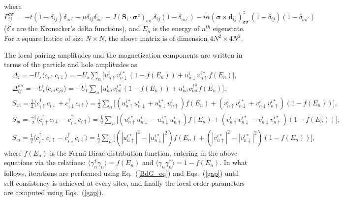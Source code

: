 \documentclass[aps,prl,reprint,nobibnotes]{revtex4-1}
\begin{document}
\noindent where $\Gamma_{ij}^{\sigma\sigma^{\prime}}=-t(1-\delta_{ij})\delta_{\sigma \sigma^{\prime}}-\mu \delta_{ij} \delta_{\sigma \sigma^{\prime}}-J(\mathbf{S}_i \cdot \boldsymbol{\sigma}^{z})_{\sigma\sigma^{\prime}}\delta_{ij}(1-\delta_{\sigma\sigma^{\prime}}) -i\alpha ({\boldsymbol{\sigma}}{\times}\mathbf{d}_{ij})_{\sigma \sigma^{'}}^{z}(1-\delta_{ij})(1- \delta_{\sigma \sigma^{\prime}})$ ($\delta$'s are the Kronecker's delta functions), and $E_n$ is the energy of $n^{th}$ eigenstate. For a square lattice of size $N \times N$, the above matrix is of dimension $4N^2 \times 4N^2$.

The local pairing amplitudes and the magnetization components are written in terms of the particle and hole amplitudes as 
\begin{align}
&\Delta_i=-U_s\langle c_{i\uparrow}c_{i\downarrow}\rangle=-U_s\sum_{n}  \Big[ u_{n\uparrow}^i v_{n\downarrow}^{i*}(1-f(E_n))+u_{n\downarrow}^i v_{n\uparrow}^{i*}f(E_n) \Big], \nonumber \\
&\Delta_{ij}^{\sigma \sigma}=-U_t \langle c_{i\sigma}c_{j\sigma}\rangle=-U_t\sum_{n} \Big[ u_{n\sigma}^i v_{n\sigma}^{j*}(1-f(E_n))+u_{n\sigma}^i v_{n\sigma}^{j*}f(E_n) \Big], \nonumber \\
&S_{xi}=\frac{1}{2}\langle c_{i\uparrow}^{\dagger}c_{i\downarrow}+c_{i\downarrow}^{\dagger}c_{i\uparrow} \rangle=\frac{1}{2}\sum_{n} \Big[ (u_{n\uparrow}^{i*}u_{n\downarrow}^i+u_{n\downarrow}^{i*}u_{n\uparrow}^i) f(E_n)+(v_{n\uparrow}^{i}v_{n\downarrow}^{i*}+v_{n\downarrow}^{i}v_{n\uparrow}^{i*})(1-f(E_n)) \Big], \nonumber \\
&S_{yi}=\frac{-i}{2}\langle c_{i\uparrow}^{\dagger}c_{i\downarrow}-c_{i\downarrow}^{\dagger}c_{i\uparrow} \rangle=\frac{1}{2}\sum_{n} \Big[ (u_{n\uparrow}^{i*}u_{n\downarrow}^i-u_{n\downarrow}^{i*}u_{n\uparrow}^i) f(E_n)+(v_{n\uparrow}^{i}v_{n\downarrow}^{i*}-v_{n\downarrow}^{i}v_{n\uparrow}^{i*})(1-f(E_n)) \Big], \nonumber \\
&S_{zi}=\frac{1}{2}\langle c_{i\uparrow}^{\dagger}c_{i\uparrow}-c_{i\downarrow}^{\dagger}c_{i\downarrow} \rangle=\frac{1}{2}\sum_{n} \Big[ (|u_{n\uparrow}^{i*}|^2 - |u_{n\downarrow}^{i*}|^2) f(E_n)+(|v_{n\uparrow}^{i*}|^2 - |v_{n\downarrow}^{i*}|^2) (1-f(E_n)) \Big],
\label{gap}
\end{align}
\noindent where $f(E_n)$ is the Fermi-Dirac distribution function, entering in the above equations via the relations: $\langle \gamma_n^{\dagger} \gamma_n \rangle=f(E_n)$ and $\langle \gamma_n \gamma_n^{\dagger} \rangle=1-f(E_n)$. In what follows, iterations are performed using Eq.~(\ref{BdG_eq}) and Eqs.~(\ref{gap}) until self-consistency is achieved at every sites, and finally the local order parameters are computed using Eqs.~(\ref{gap}).
\end{document}

